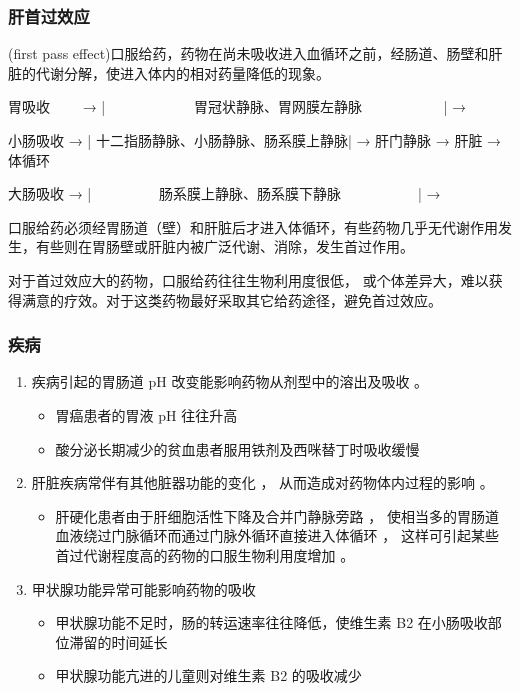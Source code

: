 \begin{frame}
    \frametitle{肝首过效应}
    (first pass effect)口服给药，药物在尚未吸收进入血循环之前，经肠道、肠壁和肝脏的代谢分解，使进入体内的相对药量降低的现象。

    \medskip

    胃吸收~~~~ → |~~~~~~~~~~~~ 胃冠状静脉、胃网膜左静脉 ~~~~~~~~~~~|  →

    小肠吸收 → | 十二指肠静脉、小肠静脉、肠系膜上静脉|  → 肝门静脉 → 肝脏 → 体循环

    大肠吸收 → |~~~~~~~~~ 肠系膜上静脉、肠系膜下静脉~~~~~~~~~~~|  →

    \medskip

    口服给药必须经胃肠道（壁）和肝脏后才进入体循环，有些药物几乎无代谢作用发生，有些则在胃肠壁或肝脏内被广泛代谢、消除，发生首过作用。
    
    对于首过效应大的药物，口服给药往往生物利用度很低， 或个体差异大，难以获得满意的疗效。对于这类药物最好采取其它给药途径，避免首过效应。 
\end{frame}


\begin{frame}
    \frametitle{疾病}
    \begin{enumerate}
      \item 疾病引起的胃肠道 pH 改变能影响药物从剂型中的溶出及吸收 。
        \begin{itemize}
          \item 胃癌患者的胃液 pH 往往升高
          \item 酸分泌长期减少的贫血患者服用铁剂及西咪替丁时吸收缓慢
        \end{itemize}
      \item 肝脏疾病常伴有其他脏器功能的变化 ， 从而造成对药物体内过程的影响 。
        \begin{itemize}
          \item 肝硬化患者由于肝细胞活性下降及合并门静脉旁路 ， 使相当多的胃肠道血液绕过门脉循环而通过门脉外循环直接进入体循环 ， 这样可引起某些首过代谢程度高的药物的口服生物利用度增加 。
        \end{itemize}
      \item 甲状腺功能异常可能影响药物的吸收
        \begin{itemize}
          \item 甲状腺功能不足时，肠的转运速率往往降低，使维生素 B2 在小肠吸收部位滞留的时间延长
          \item 甲状腺功能亢进的儿童则对维生素 B2 的吸收减少
        \end{itemize}
    \end{enumerate}
\end{frame}

